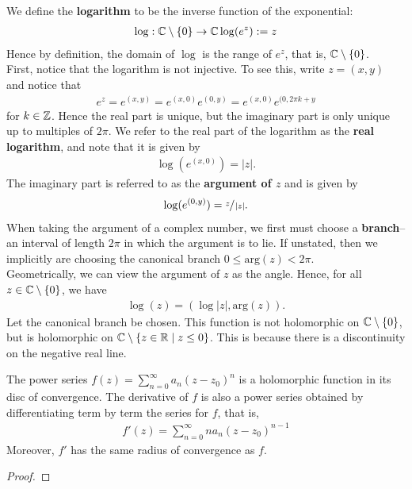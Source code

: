 \documentclass{memoir}
\begin{document}
\begin{exmp}[Logarithm]
We define the \textbf{logarithm} to be the inverse function of the exponential:
\begin{align*}
	\log: \mathbb{C}\setminus\left\{ 0 \right\} \to \mathbb{C}
	\log(e^{z}) := z
\end{align*}
Hence by definition, the domain of \(\log\) is the range of \(e^{z}\), that is, \(\mathbb{C}\setminus \left\{ 0 \right\} \).\\

First, notice that the logarithm is not injective. To see this, write \(z = (x,y)\) and notice that
\begin{align*}
	e^{z} = e^{(x,y)} = e^{(x,0)}e^{(0,y)} = e^{(x,0)}e^{(0,2\pi k+ y}
\end{align*}
for \(k \in \mathbb{Z}\). Hence the real part is unique, but the imaginary part is only unique up to multiples of \(2\pi \). We refer to the real part of the logarithm as the \textbf{real logarithm}, and note that it is given by
\begin{align*}
	\log(e^{(x,0)}) = \left| z \right| .
\end{align*}
The imaginary part is referred to as the \textbf{argument of \(z\)} and is given by
\begin{align*}
	\log(e^{(0,y)}) = \sfrac{z}{\left| z \right| }.
\end{align*}
When taking the argument of a complex number, we first must choose a \textbf{branch}-- an interval of length \(2\pi \) in which the argument is to lie. If unstated, then we implicitly are choosing the canonical branch \(0\leq \textrm{arg}(z)<2\pi \).\\

Geometrically, we can view the argument of \(z\) as the angle. Hence, for all \(z \in \mathbb{C}\setminus\left\{ 0 \right\} \), we have
\begin{align*}
	\log(z) = (\log\left| z \right|, \textrm{arg}(z)).
\end{align*}
Let the canonical branch be chosen. This function is not holomorphic on \(\mathbb{C}\setminus \left\{ 0 \right\}\), but is holomorphic on \(\mathbb{C}\setminus \left\{ z\in \mathbb{R} \mid z \leq 0 \right\} \). This is because there is a discontinuity on the negative real line.
\end{exmp}

\begin{thm}
	The power series \(f(z) = \sum_{n=0}^{\infty} a_n (z-z_0)^n\) is a holomorphic function in its disc of convergence. The derivative of \(f\) is also a power series obtained by differentiating term by term the series for \(f\), that is,
	\begin{align*}
		f'(z) = \sum_{n=0}^{\infty} na_n(z-z_0)^{n-1}
	\end{align*}
	Moreover, \(f'\) has the same radius of convergence as \(f\).
\end{thm}
\begin{proof}
	
\end{proof}
\end{document}
